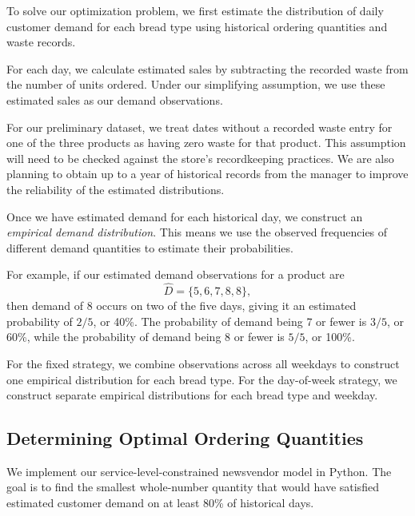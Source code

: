 \documentclass[11pt]{article}
\begin{document}
To solve our optimization problem, we first estimate the distribution of daily customer demand for each bread type using historical ordering quantities and waste records.

For each day, we calculate estimated sales by subtracting the recorded waste from the number of units ordered. Under our simplifying assumption, we use these estimated sales as our demand observations.

For our preliminary dataset, we treat dates without a recorded waste entry for one of the three products as having zero waste for that product. This assumption will need to be checked against the store's recordkeeping practices. We are also planning to obtain up to a year of historical records from the manager to improve the reliability of the estimated distributions.

Once we have estimated demand for each historical day, we construct an \emph{empirical demand distribution}. This means we use the observed frequencies of different demand quantities to estimate their probabilities.

For example, if our estimated demand observations for a product are
\begin{equation}
\widehat{D}=\{5,6,7,8,8\},
\end{equation}
then demand of 8 occurs on two of the five days, giving it an estimated probability of $2/5$, or 40\%. The probability of demand being 7 or fewer is $3/5$, or 60\%, while the probability of demand being 8 or fewer is $5/5$, or 100\%.

For the fixed strategy, we combine observations across all weekdays to construct one empirical distribution for each bread type. For the day-of-week strategy, we construct separate empirical distributions for each bread type and weekday.

\subsection{Determining Optimal Ordering Quantities}

We implement our service-level-constrained newsvendor model in Python. The goal is to find the smallest whole-number quantity that would have satisfied estimated customer demand on at least 80\% of historical days.
\end{document}
